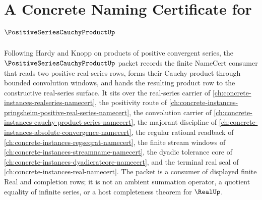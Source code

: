 \chapter{A Concrete Naming Certificate for $\PositiveSeriesCauchyProductUp$}
\label{ch:concrete-instances-positive-series-cauchy-product-namecert}

Following Hardy and Knopp on products of positive convergent series, the $\PositiveSeriesCauchyProductUp$ packet records the finite NameCert consumer that reads two positive real-series rows, forms their Cauchy product through bounded convolution windows, and hands the resulting product row to the constructive real-series surface. It sits over the real-series carrier of \autoref{ch:concrete-instances-realseries-namecert}, the positivity route of \autoref{ch:concrete-instances-pringsheim-positive-real-series-namecert}, the convolution carrier of \autoref{ch:concrete-instances-cauchy-product-series-namecert}, the majorant discipline of \autoref{ch:concrete-instances-absolute-convergence-namecert}, the regular rational readback of \autoref{ch:concrete-instances-regseqrat-namecert}, the finite stream windows of \autoref{ch:concrete-instances-streamname-namecert}, the dyadic tolerance core of \autoref{ch:concrete-instances-dyadicratcore-namecert}, and the terminal real seal of \autoref{ch:concrete-instances-real-namecert}. The packet is a consumer of displayed finite Real and completion rows; it is not an ambient summation operator, a quotient equality of infinite series, or a host completeness theorem for $\RealUp$.


